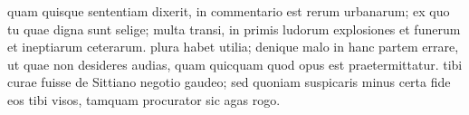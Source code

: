  quam quisque sententiam dixerit, in commentario est rerum urbanarum; ex quo tu quae digna sunt selige; multa transi, in primis ludorum explosiones et funerum et ineptiarum ceterarum. plura habet utilia; denique malo in hanc partem errare, ut quae non desideres audias, quam quicquam quod opus est praetermittatur. tibi curae fuisse de Sittiano negotio gaudeo; sed quoniam suspicaris minus certa fide eos tibi visos, tamquam procurator sic agas rogo.
